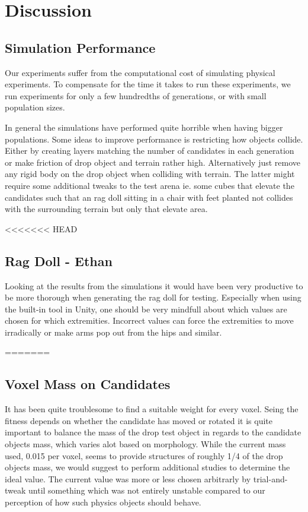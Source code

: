 \section{Discussion}
\subsection{Simulation Performance}
Our experiments suffer from the computational cost of simulating physical
experiments. To compensate for the time it takes to run these experiments, we
run experiments for only a few hundredths of generations, or with small
population sizes. 

In general the
simulations have performed quite horrible when having bigger populations. Some
ideas to improve performance is restricting how objects collide. Either by
creating layers matching the number of candidates in each generation or make
friction of drop object and terrain rather high. Alternatively just remove any
rigid body on the drop object when colliding with terrain. The latter might
require some additional tweaks to the test arena ie. some cubes that elevate
the candidates such that an rag doll sitting in a chair with feet planted not
collides with the surrounding terrain but only that elevate area.

<<<<<<< HEAD
\subsection{Rag Doll - Ethan}
Looking at the results from the simulations it would have been very productive to be more
thorough when generating the rag doll for testing.
Especially when using the built-in tool in Unity, one should be very mindfull about which values are chosen for which extremities.
Incorrect values can force the extremities to move irradically or make arms pop out from the hips and similar.

=======
\subsection{Voxel Mass on Candidates} It has been quite troublesome to find a
suitable weight for every voxel. Seing the fitness depends on whether the
candidate has moved or rotated it is quite important to balance the mass of the
drop test object in regards to the candidate objects mass, which varies alot
based on morphology. While the current mass used, 0.015 per voxel, seems to
provide structures of roughly 1/4 of the drop objects mass, we would suggest to
perform additional studies to determine the ideal value. The current value was
more or less chosen arbitrarly by trial-and-tweak until something which was not
entirely unstable compared to our perception of how such physics objects should
behave.

